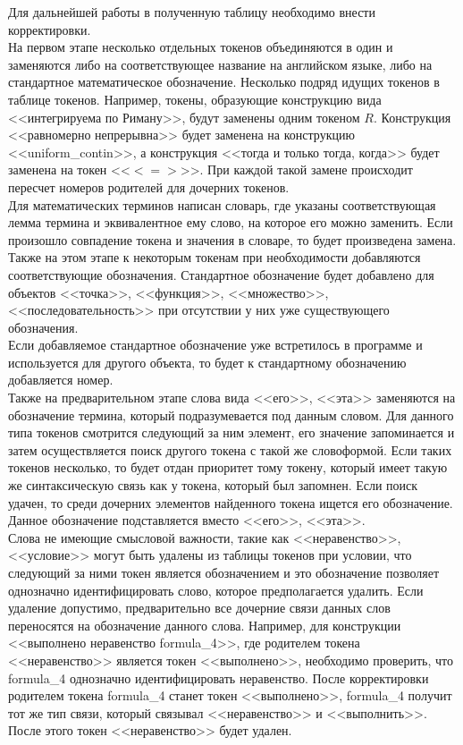 \documentclass[12pt]{article}
\begin{document}
Для дальнейшей работы в полученную таблицу необходимо внести корректировки. \\

На первом этапе несколько отдельных токенов объединяются в один и заменяются либо на соответствующее название на английском языке, либо на стандартное математическое обозначение. Несколько подряд идущих токенов в таблице токенов. Например, токены, образующие конструкцию вида <<интегрируема по Риману>>, будут заменены одним токеном $R$. Конструкция <<равномерно непрерывна>> будет заменена на конструкцию <<uniform\_contin>>, а конструкция <<тогда и только тогда, когда>> будет заменена на токен <<$<=>$>>. При каждой такой замене происходит пересчет номеров родителей для дочерних токенов.\\

Для математических терминов написан словарь, где указаны соответствующая лемма термина и эквивалентное ему слово, на которое его можно заменить. Если произошло совпадение токена и значения в словаре, то будет произведена замена.  Также на этом этапе к некоторым токенам при необходимости добавляются соответствующие обозначения.  Стандартное обозначение будет добавлено для объектов <<точка>>, <<функция>>, <<множество>>, <<последовательность>> при отсутствии у них уже существующего обозначения. \\

Если добавляемое стандартное обозначение уже встретилось в программе и используется для другого объекта, то будет к стандартному обозначению добавляется номер.\\

Также на предварительном этапе слова вида <<его>>, <<эта>> заменяются на обозначение термина, который подразумевается под данным словом. Для данного типа токенов смотрится следующий за ним элемент, его значение запоминается и затем осуществляется поиск другого токена с такой же словоформой. Если таких токенов несколько, то будет отдан приоритет тому токену, который имеет такую же синтаксическую связь как у токена, который был запомнен. Если поиск удачен, то среди дочерних элементов найденного токена ищется его обозначение. Данное обозначение подставляется вместо <<его>>, <<эта>>. \\

Слова не имеющие смысловой важности, такие как <<неравенство>>, <<условие>> могут быть удалены из таблицы токенов при условии, что следующий за ними токен является обозначением и это обозначение позволяет однозначно идентифицировать слово, которое предполагается удалить. Если удаление допустимо, предварительно все дочерние связи данных слов переносятся на обозначение данного слова. Например, для конструкции <<выполнено неравенство formula\_4>>, где родителем токена <<неравенство>> является токен <<выполнено>>,  необходимо проверить, что formula\_4 однозначно идентифицировать неравенство. После корректировки родителем токена formula\_4 станет токен <<выполнено>>,  formula\_4 получит тот же тип связи, который связывал <<неравенство>> и <<выполнить>>. После этого токен <<неравенство>> будет удален.\\
\end{document}

